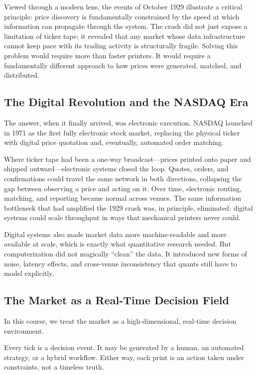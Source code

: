 Viewed through a modern lens, the events of October 1929 illustrate a critical principle: price discovery is fundamentally constrained by the speed at which information can propagate through the system.
The crash did not just expose a limitation of ticker tape; it revealed that any market whose data infrastructure cannot keep pace with its trading activity is structurally fragile.
Solving this problem would require more than faster printers. It would require a fundamentally different approach to how prices were generated, matched, and distributed.

\subsection{The Digital Revolution and the NASDAQ Era}

The answer, when it finally arrived, was electronic execution. NASDAQ launched in 1971 as the first fully electronic stock market, replacing the physical ticker with digital price quotation and, eventually, automated order matching.

Where ticker tape had been a one-way broadcast---prices printed onto paper and shipped outward---electronic systems closed the loop. Quotes, orders, and confirmations could travel the same network in both directions, collapsing the gap between observing a price and acting on it.
Over time, electronic routing, matching, and reporting became normal across venues. The same information bottleneck that had amplified the 1929 crash was, in principle, eliminated: digital systems could scale throughput in ways that mechanical printers never could.

Digital systems also made market data more machine-readable and more available at scale, which is exactly what quantitative research needed. But computerization did not magically ``clean'' the data. It introduced new forms of noise, latency effects, and cross-venue inconsistency that quants still have to model explicitly.

\subsection{The Market as a Real-Time Decision Field}

In this course, we treat the market as a high-dimensional, real-time decision environment.

Every tick is a decision event. It may be generated by a human, an automated strategy, or a hybrid workflow. Either way, each print is an action taken under constraints, not a timeless truth.


